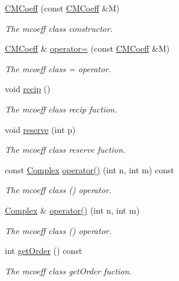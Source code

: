 \begin{DoxyCompactItemize}
\hyperlink{classCMCoeff_ae5a7fcbb8f989dbbff71d79738fd9356}{C\-M\-Coeff} (const \hyperlink{classCMCoeff}{C\-M\-Coeff} \&M)
\begin{DoxyCompactList}\small\item\em The mcoeff class constructor. \end{DoxyCompactList}\item 
\hyperlink{classCMCoeff}{C\-M\-Coeff} \& \hyperlink{classCMCoeff_a92c5e5e988695c301c47e3212930a68f}{operator=} (const \hyperlink{classCMCoeff}{C\-M\-Coeff} \&M)
\begin{DoxyCompactList}\small\item\em The mcoeff class = operator. \end{DoxyCompactList}\item 
void \hyperlink{classCMCoeff_a6e7e750022bf6a6f32dff9092881647c}{recip} ()
\begin{DoxyCompactList}\small\item\em The mcoeff class recip fuction. \end{DoxyCompactList}\item 
void \hyperlink{classCMCoeff_a10d5db85d700255768d091c10fda818c}{reserve} (int p)
\begin{DoxyCompactList}\small\item\em The mcoeff class reserve fuction. \end{DoxyCompactList}\item 
const \hyperlink{util_8h_a0ef19d29521fc1e3356ea268ba175cfc}{Complex} \hyperlink{classCMCoeff_a8776dd638fca3d95f813acb93c7896c7}{operator()} (int n, int m) const 
\begin{DoxyCompactList}\small\item\em The mcoeff class () operator. \end{DoxyCompactList}\item 
\hyperlink{util_8h_a0ef19d29521fc1e3356ea268ba175cfc}{Complex} \& \hyperlink{classCMCoeff_ad6668675df0fa31437bebee2a2b00e0f}{operator()} (int n, int m)
\begin{DoxyCompactList}\small\item\em The mcoeff class () operator. \end{DoxyCompactList}\item 
int \hyperlink{classCMCoeff_a4ca84260f5a63a33547ebce310b21c32}{get\-Order} () const 
\begin{DoxyCompactList}\small\item\em The mcoeff class get\-Order fuction. \end{DoxyCompactList}\item 

\end{DoxyCompactItemize}
